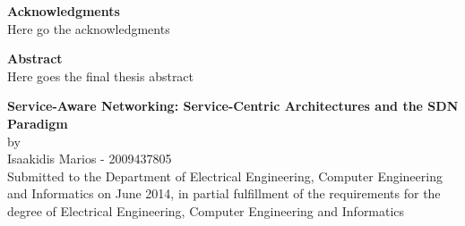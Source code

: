 \documentclass[12pt,a4paper,oneside]{article}
\begin{document}




\newpage
\thispagestyle{empty}
{\Large \bf \noindent Acknowledgments}
\\Here go the acknowledgments


\newpage
\thispagestyle{empty}
{\Large \bf \noindent Abstract}
\\Here goes the final thesis abstract


\newpage
\thispagestyle{empty}
\tableofcontents


\newpage
\pagestyle{plain}
\setcounter{page}{1}

\renewcommand{\nomname}{Abbreviations}
\printnomenclature


\newpage
\begin{center}
{\large {\bf  Service-Aware Networking: Service-Centric Architectures and the SDN Paradigm}\\[0.5cm] by \\[0.5cm] Isaakidis Marios - 2009437805}
 ~\\[0.5cm]
Submitted to the Department of Electrical Engineering, Computer Engineering and Informatics on June 2014, in partial fulfillment of the requirements for the degree of Electrical Engineering, Computer Engineering and Informatics
\end{center}

\vfill
\end{document}

